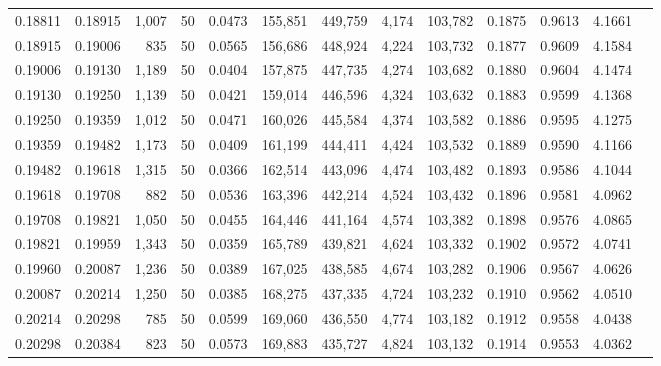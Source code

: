 \begin{tabular}{rrrrrrrrrrrrr}
0.18811 & 0.18915 & 1,007 &  50 &                                     0.0473 & 155,851 & 449,759 &   4,174 & 103,782 & 0.1875 & 0.9613 & 4.1661 \\
0.18915 & 0.19006 &   835 &  50 &                                     0.0565 & 156,686 & 448,924 &   4,224 & 103,732 & 0.1877 & 0.9609 & 4.1584 \\
0.19006 & 0.19130 & 1,189 &  50 &                                     0.0404 & 157,875 & 447,735 &   4,274 & 103,682 & 0.1880 & 0.9604 & 4.1474 \\
0.19130 & 0.19250 & 1,139 &  50 &                                     0.0421 & 159,014 & 446,596 &   4,324 & 103,632 & 0.1883 & 0.9599 & 4.1368 \\
0.19250 & 0.19359 & 1,012 &  50 &                                     0.0471 & 160,026 & 445,584 &   4,374 & 103,582 & 0.1886 & 0.9595 & 4.1275 \\
0.19359 & 0.19482 & 1,173 &  50 &                                     0.0409 & 161,199 & 444,411 &   4,424 & 103,532 & 0.1889 & 0.9590 & 4.1166 \\
0.19482 & 0.19618 & 1,315 &  50 &                                     0.0366 & 162,514 & 443,096 &   4,474 & 103,482 & 0.1893 & 0.9586 & 4.1044 \\
0.19618 & 0.19708 &   882 &  50 &                                     0.0536 & 163,396 & 442,214 &   4,524 & 103,432 & 0.1896 & 0.9581 & 4.0962 \\
0.19708 & 0.19821 & 1,050 &  50 &                                     0.0455 & 164,446 & 441,164 &   4,574 & 103,382 & 0.1898 & 0.9576 & 4.0865 \\
0.19821 & 0.19959 & 1,343 &  50 &                                     0.0359 & 165,789 & 439,821 &   4,624 & 103,332 & 0.1902 & 0.9572 & 4.0741 \\
0.19960 & 0.20087 & 1,236 &  50 &                                     0.0389 & 167,025 & 438,585 &   4,674 & 103,282 & 0.1906 & 0.9567 & 4.0626 \\
0.20087 & 0.20214 & 1,250 &  50 &                                     0.0385 & 168,275 & 437,335 &   4,724 & 103,232 & 0.1910 & 0.9562 & 4.0510 \\
0.20214 & 0.20298 &   785 &  50 &                                     0.0599 & 169,060 & 436,550 &   4,774 & 103,182 & 0.1912 & 0.9558 & 4.0438 \\
0.20298 & 0.20384 &   823 &  50 &                                     0.0573 & 169,883 & 435,727 &   4,824 & 103,132 & 0.1914 & 0.9553 & 4.0362 \\

\end{tabular}
